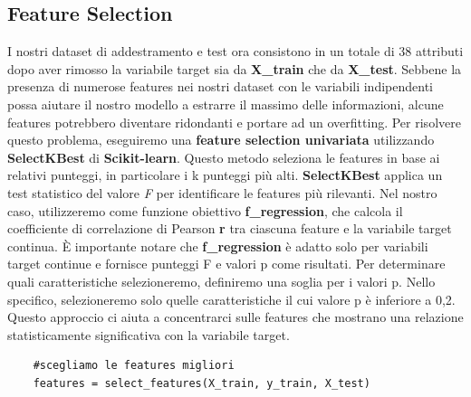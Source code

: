 \documentclass{article}
\begin{document}
\subsection{Feature Selection}
I nostri dataset di addestramento e test ora consistono in un totale di 38 attributi dopo aver rimosso la variabile target sia da \textbf{X\_train} che da \textbf{X\_test}.
Sebbene la presenza di numerose features nei nostri dataset con le variabili indipendenti possa aiutare il nostro modello a estrarre il massimo delle informazioni, alcune features potrebbero diventare ridondanti e portare ad un overfitting. Per risolvere questo problema, eseguiremo una \textbf{feature selection univariata} utilizzando \textbf{SelectKBest} di \textbf{Scikit-learn}. Questo metodo seleziona le features in base ai relativi punteggi, in particolare i k punteggi più alti.
\textbf{SelectKBest} applica un test statistico del valore \textit{F} per identificare le features più rilevanti. Nel nostro caso, utilizzeremo come funzione obiettivo \textbf{f\_regression}, che calcola il coefficiente di correlazione di Pearson \textbf{r} tra ciascuna feature e la variabile target continua. È importante notare che \textbf{f\_regression} è adatto solo per variabili target continue e fornisce punteggi F e valori p come risultati.
Per determinare quali caratteristiche selezioneremo, definiremo una soglia per i valori p. Nello specifico, selezioneremo solo quelle caratteristiche il cui valore p è inferiore a 0,2. Questo approccio ci aiuta a concentrarci sulle features che mostrano una relazione statisticamente significativa con la variabile target.
\begin{verbatim}
    #scegliamo le features migliori
    features = select_features(X_train, y_train, X_test)
\end{verbatim}
\end{document}
